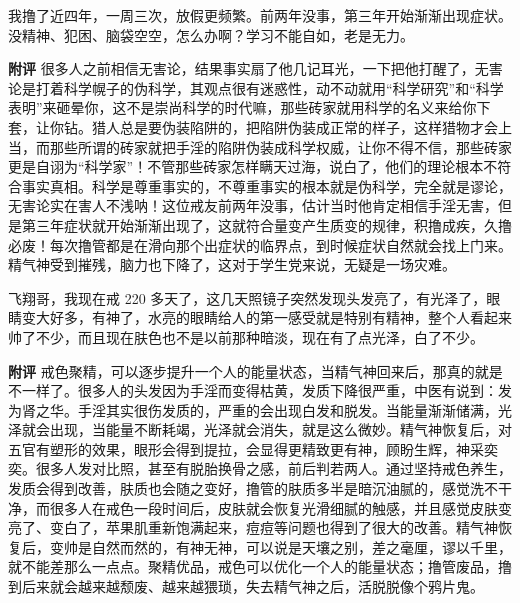 \begin{case}
    我撸了近四年，一周三次，放假更频繁。前两年没事，第三年开始渐渐出现症状。没精神、犯困、脑袋空空，怎么办啊？学习不能自如，老是无力。

    \textbf{附评} 很多人之前相信无害论，结果事实扇了他几记耳光，一下把他打醒了，无害论是打着科学幌子的伪科学，其观点很有迷惑性，动不动就用“科学研究”和“科学表明”来砸晕你，这不是崇尚科学的时代嘛，那些砖家就用科学的名义来给你下套，让你钻。猎人总是要伪装陷阱的，把陷阱伪装成正常的样子，这样猎物才会上当，而那些所谓的砖家就把手淫的陷阱伪装成科学权威，让你不得不信，那些砖家更是自诩为“科学家”！不管那些砖家怎样瞒天过海，说白了，他们的理论根本不符合事实真相。科学是尊重事实的，不尊重事实的根本就是伪科学，完全就是谬论，无害论实在害人不浅呐！这位戒友前两年没事，估计当时他肯定相信手淫无害，但是第三年症状就开始渐渐出现了，这就符合量变产生质变的规律，积撸成疾，久撸必废！每次撸管都是在滑向那个出症状的临界点，到时候症状自然就会找上门来。精气神受到摧残，脑力也下降了，这对于学生党来说，无疑是一场灾难。
\end{case}

\begin{case}
    飞翔哥，我现在戒 220 多天了，这几天照镜子突然发现头发亮了，有光泽了，眼睛变大好多，有神了，水亮的眼睛给人的第一感受就是特别有精神，整个人看起来帅了不少，而且现在肤色也不是以前那种暗淡，现在有了点光泽，白了不少。

    \textbf{附评} 戒色聚精，可以逐步提升一个人的能量状态，当精气神回来后，那真的就是不一样了。很多人的头发因为手淫而变得枯黄，发质下降很严重，中医有说到：发为肾之华。手淫其实很伤发质的，严重的会出现白发和脱发。当能量渐渐储满，光泽就会出现，当能量不断耗竭，光泽就会消失，就是这么微妙。精气神恢复后，对五官有塑形的效果，眼形会得到提拉，会显得更精致更有神，顾盼生辉，神采奕奕。很多人发对比照，甚至有脱胎换骨之感，前后判若两人。通过坚持戒色养生，发质会得到改善，肤质也会随之变好，撸管的肤质多半是暗沉油腻的，感觉洗不干净，而很多人在戒色一段时间后，皮肤就会恢复光滑细腻的触感，并且感觉皮肤变亮了、变白了，苹果肌重新饱满起来，痘痘等问题也得到了很大的改善。精气神恢复后，变帅是自然而然的，有神无神，可以说是天壤之别，差之毫厘，谬以千里，就不能差那么一点点。聚精优品，戒色可以优化一个人的能量状态；撸管废品，撸到后来就会越来越颓废、越来越猥琐，失去精气神之后，活脱脱像个鸦片鬼。
\end{case}

